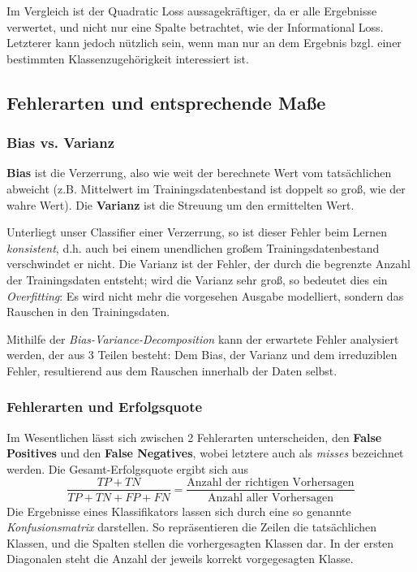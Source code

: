 Im Vergleich ist der Quadratic Loss aussagekräftiger, da er alle Ergebnisse verwertet,
und nicht nur eine Spalte betrachtet, wie der Informational Loss. Letzterer
kann jedoch nützlich sein, wenn man nur an dem Ergebnis bzgl. einer bestimmten
Klassenzugehörigkeit interessiert ist.

\subsection{Fehlerarten und entsprechende Maße}
\subsubsection{Bias vs. Varianz}
\textbf{Bias} ist die Verzerrung, also wie weit der berechnete Wert vom tatsächlichen
abweicht (z.B. Mittelwert im Trainingsdatenbestand ist doppelt so groß, wie der
wahre Wert). Die \textbf{Varianz} ist die Streuung um den ermittelten Wert.

Unterliegt unser Classifier einer Verzerrung, so ist dieser Fehler beim Lernen
\textit{konsistent}, d.h. auch bei einem unendlichen großem Trainingsdatenbestand
verschwindet er nicht. Die Varianz ist der Fehler, der durch die begrenzte Anzahl
der Trainingsdaten entsteht; wird die Varianz sehr groß, so bedeutet dies ein
\textit{Overfitting}: Es wird nicht mehr die vorgesehen Ausgabe modelliert, sondern
das Rauschen in den Trainingsdaten.

Mithilfe der \textit{Bias-Variance-Decomposition} kann der erwartete Fehler 
analysiert werden, der aus 3 Teilen besteht: Dem Bias, der Varianz und dem
irreduziblen Fehler, resultierend aus dem Rauschen innerhalb der Daten selbst.

\subsubsection{Fehlerarten und Erfolgsquote}
Im Wesentlichen lässt sich zwischen 2 Fehlerarten unterscheiden, den 
\textbf{False Positives} und den \textbf{False Negatives}, wobei letztere auch als
\textit{misses} bezeichnet werden. Die Gesamt-Erfolgsquote ergibt sich aus
\[
	\frac{TP+TN}{TP+TN+FP+FN} = \frac{\text{Anzahl der richtigen Vorhersagen}}
	{\text{Anzahl aller Vorhersagen}}
\]
Die Ergebnisse eines Klassifikators lassen sich durch eine so genannte
\textit{Konfusionsmatrix} darstellen. So repräsentieren die Zeilen die tatsächlichen
Klassen, und die Spalten stellen die vorhergesagten Klassen dar. In der ersten Diagonalen
steht die Anzahl der jeweils korrekt vorgegesagten Klasse.

